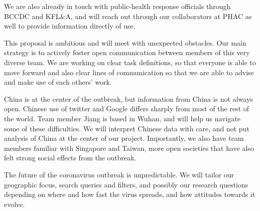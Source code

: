 We are also already in touch with public-health response officials through BCCDC and KFL\&A, and will reach out through our collaborators at PHAC as well to provide information directly of use.


This proposal is ambitious and will meet with unexpected obstacles. Our main strategy is to actively foster open communication between members of this very diverse team. We are working on clear task definitions, so that everyone is able to move forward and also clear lines of communication so that we are able to advise and make use of each others' work.

China is at the center of the outbreak, but information from China is not always open. Chinese use of twitter and Google differs sharply from most of the rest of the world. Team member Jiang is based in Wuhan, and will help us navigate some of these difficulties. We will interpret Chinese data with care, and not put analysis of China at the center of our project. Importantly, we also have team members familiar with Singapore and Taiwan, more open societies that have also felt strong social effects from the outbreak.

The future of the coronavirus outbreak is unpredictable. We will tailor our geographic focus, search queries and filters, and possibly our research questions depending on where and how fast the virus spreads, and how attitudes towards it evolve. 
